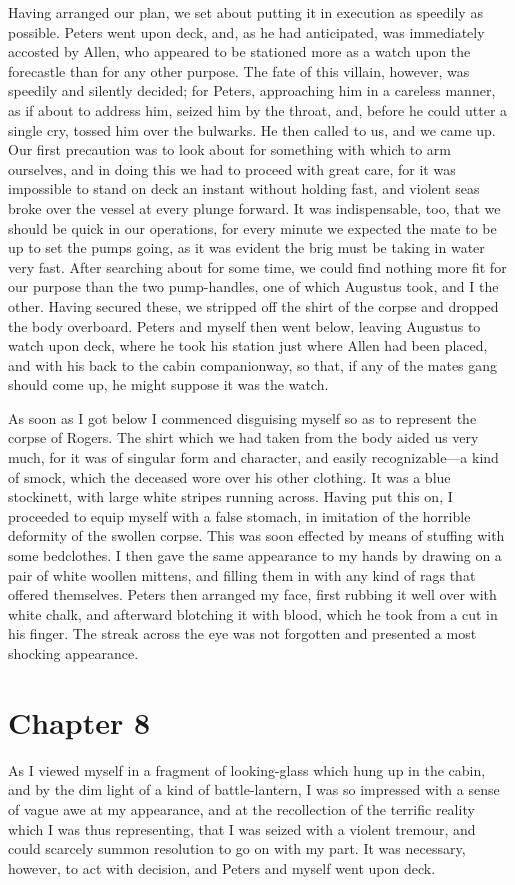Having arranged our plan, we set about putting it in execution as speedily as
possible. Peters went upon deck, and, as he had anticipated, was immediately
accosted by Allen, who appeared to be stationed more as a watch upon the
forecastle than for any other purpose. The fate of this villain, however, was
speedily and silently decided; for Peters, approaching him in a careless manner,
as if about to address him, seized him by the throat, and, before he could utter
a single cry, tossed him over the bulwarks. He then called to us, and we came
up. Our first precaution was to look about for something with which to arm
ourselves, and in doing this we had to proceed with great care, for it was
impossible to stand on deck an instant without holding fast, and violent seas
broke over the vessel at every plunge forward. It was indispensable, too, that
we should be quick in our operations, for every minute we expected the mate to
be up to set the pumps going, as it was evident the brig must be taking in water
very fast. After searching about for some time, we could find nothing more fit
for our purpose than the two pump-handles, one of which Augustus took, and I the
other. Having secured these, we stripped off the shirt of the corpse and dropped
the body overboard. Peters and myself then went below, leaving Augustus to watch
upon deck, where he took his station just where Allen had been placed, and with
his back to the cabin companionway, so that, if any of the mates gang should
come up, he might suppose it was the watch. 

As soon as I got below I commenced disguising myself so as to represent the
corpse of Rogers. The shirt which we had taken from the body aided us very much,
for it was of singular form and character, and easily recognizable---a kind of
smock, which the deceased wore over his other clothing. It was a blue
stockinett, with large white stripes running across. Having put this on, I
proceeded to equip myself with a false stomach, in imitation of the horrible
deformity of the swollen corpse. This was soon effected by means of stuffing
with some bedclothes. I then gave the same appearance to my hands by drawing on
a pair of white woollen mittens, and filling them in with any kind of rags that
offered themselves. Peters then arranged my face, first rubbing it well over
with white chalk, and afterward blotching it with blood, which he took from a
cut in his finger. The streak across the eye was not forgotten and presented a
most shocking appearance. 

\section{Chapter 8}
As I viewed myself in a fragment of looking-glass which hung up in the
cabin, and by the dim light of a kind of battle-lantern, I was so impressed with
a sense of vague awe at my appearance, and at the recollection of the terrific
reality which I was thus representing, that I was seized with a violent tremour,
and could scarcely summon resolution to go on with my part. It was necessary,
however, to act with decision, and Peters and myself went upon deck. 

